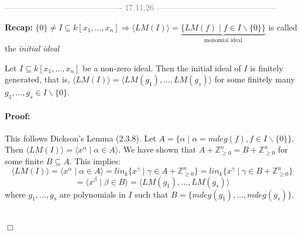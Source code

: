 \begin{center}
  \textcolor{gray}{------------------------------------------- 17.11.26 --------------------------------------------} \\[0.3em]
\end{center}
\vspace{0.3em}

\textbf{Recap:} $\{0\} \neq I \subseteq k[x_1, \dots, x_n] \Rightarrow \langle LM(I) \rangle = \underbrace{\{LM(f) \mid f \in I \backslash \{0\}\}}_{\text{monomial ideal}}$ is called the \textit{initial ideal} 

\begin{proposition}[title = Proposition 2.4.3]
    Let $I \subseteq k[x_1, \dots, x_n]$ be a non-zero ideal. Then the initial ideal of $I$ is finitely generated, that is, $\langle LM(I)\rangle = \langle LM(g_1), \ldots, LM(g_s) \rangle$ for some
    finitely many $g_1, \ldots, g_s \in I \backslash \{0\}$. 

    \paragraph{Proof:} This follows Dickson's Lemma (2.3.8). Let $A = \{\alpha \mid \alpha =  mdeg(f), f \in I \backslash \{0\}\}$. 
    Then $\langle LM(I) \rangle = \langle x^{\alpha} \mid \alpha \in A \rangle$. We have shown that $A + \mathbb{Z}^n_{\geq 0} =  B + \mathbb{Z}^n_{\geq 0}$ for some finite $B \subseteq A$. This implies: 
    \[\langle LM(I) \rangle = \langle x^{\alpha} \mid \alpha \in A \rangle =  lin_k \{x^{\gamma} \mid \gamma \in A + \mathbb{Z}^n_{\geq 0}\} = lin_k\{x^{\gamma} \mid \gamma \in B + \mathbb{Z}^n_{\geq 0}\}\] 
    \[= \langle x^{\beta} \mid \beta \in B \rangle  = \langle LM(g_1), \ldots, LM(g_s) \rangle\]
    where $g_1, \ldots, g_s$ are polynomials in $I$ such that $B = \{mdeg(g_1) , ..., mdeg(g_s)\}$. \ \\

        \begin{center}
        \end{center}
    \begin{flushright}
      $\Box $
    \end{flushright}
\end{proposition}

